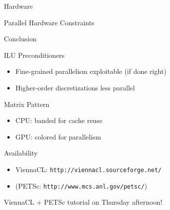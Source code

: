 




\begin{frame}{Hardware}
 \begin{center}
  Parallel Hardware Constraints
 \end{center}

\end{frame}




















\begin{frame}{Conclusion}

 \begin{block}{ILU Preconditioners}
  \begin{itemize}
   \item Fine-grained parallelism exploitable (if done right)
   \item Higher-order discretizations less parallel
  \end{itemize}
 \end{block}
 
 \begin{block}{Matrix Pattern}
  \begin{itemize}
   \item CPU: banded for cache reuse
   \item GPU: colored for parallelism
  \end{itemize}
 \end{block}

 \begin{block}{Availability}
  \begin{itemize}
   \item ViennaCL: \texttt{http://viennacl.sourceforge.net/}
   \item (PETSc:   \texttt{http://www.mcs.anl.gov/petsc/})
  \end{itemize}
 \end{block}

 \begin{center}
   ViennaCL + PETSc tutorial on Thursday afternoon!
 \end{center}

\end{frame}
